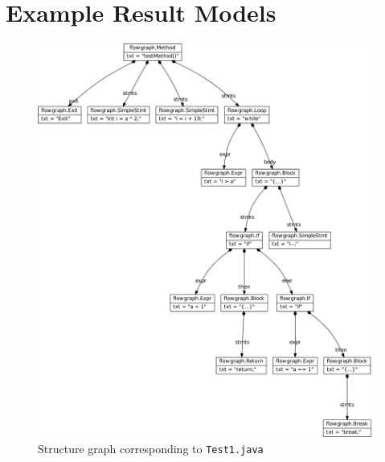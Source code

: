 \documentclass[11pt]{article}
\begin{document}
\clearpage
\section{Example Result Models}
\label{sec:result-models}

\begin{figure}[h!]
  \centering
  \includegraphics[width=\linewidth]{../results/Test1-StructureGraph}
  \caption{Structure graph corresponding to \texttt{Test1.java}}
  \label{fig:sg-test1}
\end{figure}
\end{document}
